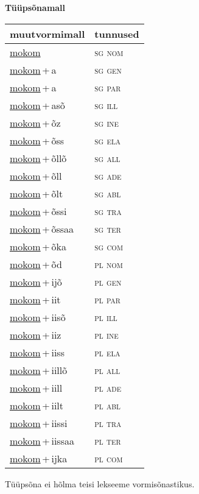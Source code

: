 
\vspace{1.8em}
\begin{minipage}{\textwidth}
\textbf{Tüüpsõnamall \,}\\

\begin{sideways}
\begin{tabular}{l l}
muutvormimall & tunnused \\
\hline
\underline{mokom} & \textsc{ sg nom } \\
\underline{mokom}\,+\,a & \textsc{ sg gen } \\
\underline{mokom}\,+\,a & \textsc{ sg par } \\
\underline{mokom}\,+\,asõ & \textsc{ sg ill } \\
\underline{mokom}\,+\,õz & \textsc{ sg ine } \\
\underline{mokom}\,+\,õss & \textsc{ sg ela } \\
\underline{mokom}\,+\,õllõ & \textsc{ sg all } \\
\underline{mokom}\,+\,õll & \textsc{ sg ade } \\
\underline{mokom}\,+\,õlt & \textsc{ sg abl } \\
\underline{mokom}\,+\,õssi & \textsc{ sg tra } \\
\underline{mokom}\,+\,õssaa & \textsc{ sg ter } \\
\underline{mokom}\,+\,õka & \textsc{ sg com } \\
\underline{mokom}\,+\,õd & \textsc{ pl nom } \\
\underline{mokom}\,+\,ijõ & \textsc{ pl gen } \\
\underline{mokom}\,+\,iit & \textsc{ pl par } \\
\underline{mokom}\,+\,iisõ & \textsc{ pl ill } \\
\underline{mokom}\,+\,iiz & \textsc{ pl ine } \\
\underline{mokom}\,+\,iiss & \textsc{ pl ela } \\
\underline{mokom}\,+\,iillõ & \textsc{ pl all } \\
\underline{mokom}\,+\,iill & \textsc{ pl ade } \\
\underline{mokom}\,+\,iilt & \textsc{ pl abl } \\
\underline{mokom}\,+\,iissi & \textsc{ pl tra } \\
\underline{mokom}\,+\,iissaa & \textsc{ pl ter } \\
\underline{mokom}\,+\,ijka & \textsc{ pl com } \\
\end{tabular}
\end{sideways}
\label{tab:tüüpsõnamall-mokom}

\end{minipage}

 
\vspace{1em}
\noindent Tüüpsõna ei hõlma teisi lekseeme vormi\-sõnastikus.
